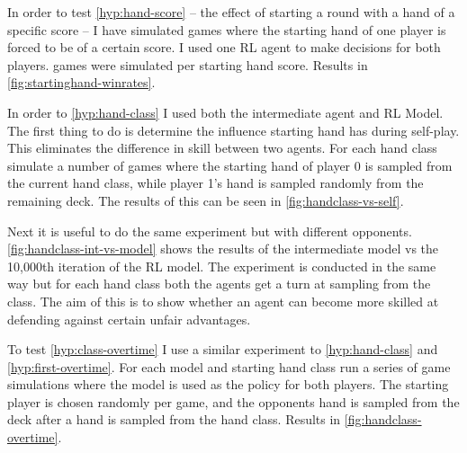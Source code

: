\documentclass[../main.tex]{subfiles}
\begin{document}
In order to test \cref{hyp:hand-score} -- the effect of starting a round with a hand of a specific score -- I have simulated games where the starting hand of one player is forced to be of a certain score. I used one RL agent to make decisions for both players.  games were simulated per starting hand score. Results in \cref{fig:startinghand-winrates}.

In order to \cref{hyp:hand-class} I used both the intermediate agent and RL Model. The first thing to do is determine the influence starting hand has during self-play. This eliminates the difference in skill between two agents. For each hand class simulate a number of games where the starting hand of player 0 is sampled from the current hand class, while player 1's hand is sampled randomly from the remaining deck. The results of this can be seen in \cref{fig:handclass-vs-self}. 

Next it is useful to do the same experiment but with different opponents. \cref{fig:handclass-int-vs-model} shows the results of the intermediate model vs the 10,000th iteration of the RL model. The experiment is conducted in the same way but for each hand class both the agents get a turn at sampling from the class. The aim of this is to show whether an agent can become more skilled at defending against certain unfair advantages. 


To test \cref{hyp:class-overtime} I use a similar experiment to \cref{hyp:hand-class} and \cref{hyp:first-overtime}. For each model and starting hand class run a series of game simulations where the model is used as the policy for both players. The starting player is chosen randomly per game, and the opponents hand is sampled from the deck after a hand is sampled from the hand class. Results in \cref{fig:handclass-overtime}.
\end{document}
